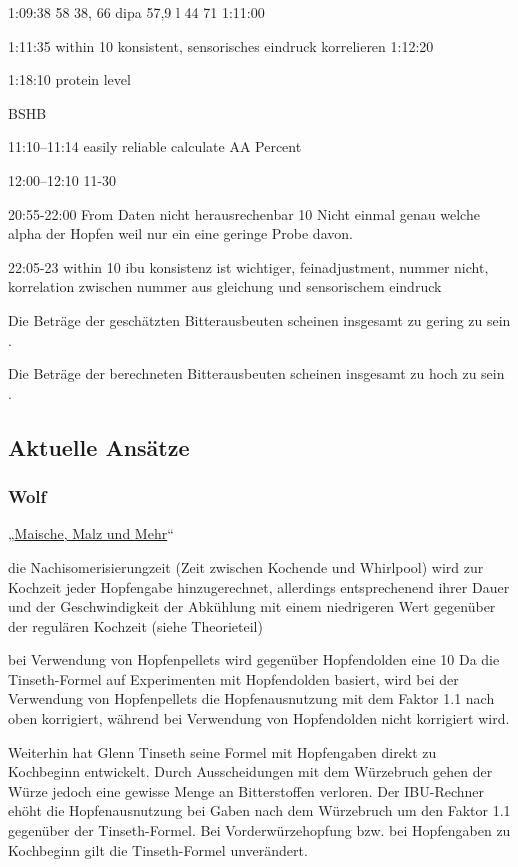 \documentclass[a4paper,parskip=half]{scrartcl}
\begin{document}
1:09:38 58
38, 66
dipa 57,9 l 44 71
1:11:00

1:11:35 within 10 %
konsistent, sensorisches eindruck korrelieren
1:12:20

1:18:10
protein level 
\parencite{Beechum2017a}

BSHB

11:10--11:14
easily reliable calculate AA Percent

12:00--12:10
11-30%

20:55-22:00
From Daten nicht herausrechenbar
10 %
Nicht einmal genau welche alpha der Hopfen weil nur ein eine geringe 
Probe davon.

22:05-23
within 10 ibu
konsistenz ist wichtiger, feinadjustment, nummer nicht,
korrelation zwischen nummer aus gleichung und sensorischem eindruck
\parencite{Smith2011}

Die Beträge der geschätzten
Bitterausbeuten scheinen insgesamt zu gering zu sein \parencite{Jones1995}.

Die Beträge
der berechneten Bitterausbeuten scheinen insgesamt zu hoch zu sein \parencite{Jones1995}.

\subsection*{Aktuelle Ansätze}

\subsubsection*{Wolf}

„\href{https://www.maischemalzundmehr.de/index.php?inhaltmitte=toolsiburechner}{Maische, Malz und Mehr}“

die Nachisomerisierungzeit (Zeit zwischen Kochende und Whirlpool) wird zur Kochzeit jeder Hopfengabe hinzugerechnet, allerdings entsprechenend ihrer Dauer und der Geschwindigkeit der Abkühlung mit einem niedrigeren Wert gegenüber der regulären Kochzeit (siehe Theorieteil) 

bei Verwendung von Hopfenpellets wird gegenüber Hopfendolden eine 10%
Da die Tinseth-Formel auf Experimenten mit Hopfendolden basiert, wird bei der Verwendung von Hopfenpellets die Hopfenausnutzung mit dem Faktor 1.1 nach oben korrigiert, während bei Verwendung von Hopfendolden nicht korrigiert wird. 

Weiterhin hat Glenn Tinseth seine Formel mit Hopfengaben direkt zu Kochbeginn entwickelt. Durch Ausscheidungen mit dem Würzebruch gehen der Würze jedoch eine gewisse Menge an Bitterstoffen verloren. Der IBU-Rechner ehöht die Hopfenausnutzung bei Gaben nach dem Würzebruch um den Faktor 1.1 gegenüber der Tinseth-Formel. Bei Vorderwürzehopfung bzw. bei Hopfengaben zu Kochbeginn gilt die Tinseth-Formel unverändert. 
\end{document}
